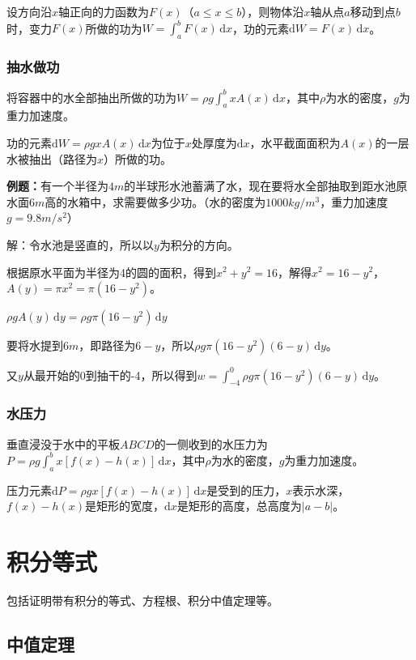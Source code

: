 \documentclass[UTF8, 12pt]{ctexart}
\begin{document}
设方向沿$x$轴正向的力函数为$F(x)$（$a\leqslant x\leqslant b$），则物体沿$x$轴从点$a$移动到点$b$时，变力$F(x)$所做的功为$W=\int_a^bF(x)\,\textrm{d}x$，功的元素$\textrm{d}W=F(x)\,\textrm{d}x$。

\subsubsection{抽水做功}

将容器中的水全部抽出所做的功为$W=\rho g\int_a^bxA(x)\,\textrm{d}x$，其中$\rho$为水的密度，$g$为重力加速度。

功的元素$\textrm{d}W=\rho gxA(x)\,\textrm{d}x$为位于$x$处厚度为$\textrm{d}x$，水平截面面积为$A(x)$的一层水被抽出（路径为$x$）所做的功。

\textbf{例题：}有一个半径为$4m$的半球形水池蓄满了水，现在要将水全部抽取到距水池原水面$6m$高的水箱中，求需要做多少功。（水的密度为$1000kg/m^3$，重力加速度$g=9.8m/s^2$）

解：令水池是竖直的，所以以$y$为积分的方向。

根据原水平面为半径为4的圆的面积，得到$x^2+y^2=16$，解得$x^2=16-y^2$，$A(y)=\pi x^2=\pi(16-y^2)$。

$\rho gA(y)\,\textrm{d}y=\rho g\pi(16-y^2)\,\textrm{d}y$

要将水提到$6m$，即路径为$6-y$，所以$\rho g\pi(16-y^2)(6-y)\,\textrm{d}y$。

又$y$从最开始的0到抽干的-4，所以得到$w=\int_{-4}^0\rho g\pi(16-y^2)(6-y)\,\textrm{d}y$。

\subsubsection{水压力}

垂直浸没于水中的平板$ABCD$的一侧收到的水压力为$P=\rho g\int_a^bx[f(x)-h(x)]\,\textrm{d}x$，其中$\rho$为水的密度，$g$为重力加速度。

压力元素$\textrm{d}P=\rho gx[f(x)-h(x)]\,\textrm{d}x$是受到的压力，$x$表示水深，$f(x)-h(x)$是矩形的宽度，$\textrm{d}x$是矩形的高度，总高度为$\vert a-b\vert$。

\section{积分等式}

包括证明带有积分的等式、方程根、积分中值定理等。

\subsection{中值定理}
\end{document}
